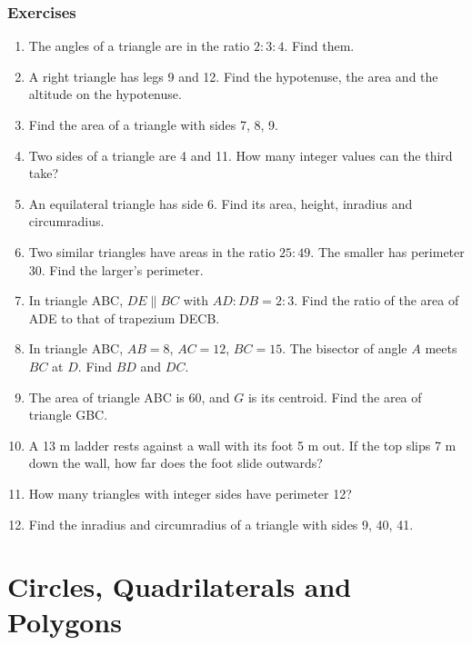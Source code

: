 \documentclass[11pt,a4paper,openany]{report}
\newenvironment{exercises}{\subsection*{Exercises \thechapter}\begin{enumerate}[label=\textbf{\thechapter.\arabic*},leftmargin=3.2em]}{\end{enumerate}}
\begin{document}
\begin{exercises}
\item The angles of a triangle are in the ratio $2:3:4$. Find them.
\item A right triangle has legs 9 and 12. Find the hypotenuse, the area and the altitude on the hypotenuse.
\item Find the area of a triangle with sides 7, 8, 9.
\item Two sides of a triangle are 4 and 11. How many integer values can the third take?
\item An equilateral triangle has side 6. Find its area, height, inradius and circumradius.
\item Two similar triangles have areas in the ratio $25:49$. The smaller has perimeter 30. Find the larger's perimeter.
\item In triangle ABC, $DE\parallel BC$ with $AD:DB=2:3$. Find the ratio of the area of ADE to that of trapezium DECB.
\item In triangle ABC, $AB=8$, $AC=12$, $BC=15$. The bisector of angle $A$ meets $BC$ at $D$. Find $BD$ and $DC$.
\item The area of triangle ABC is 60, and $G$ is its centroid. Find the area of triangle GBC.
\item A 13 m ladder rests against a wall with its foot 5 m out. If the top slips 7 m down the wall, how far does the foot slide outwards?
\item How many triangles with integer sides have perimeter 12?
\item Find the inradius and circumradius of a triangle with sides 9, 40, 41.
\end{exercises}

\chapter{Circles, Quadrilaterals and Polygons}\label{ch:circle}
\end{document}

